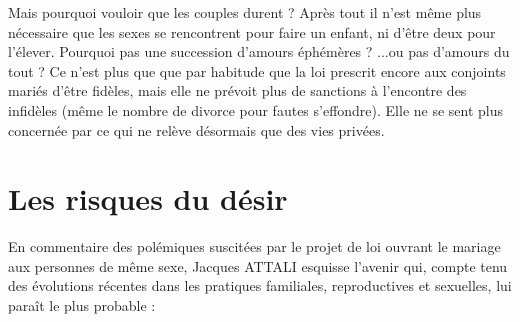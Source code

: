 Mais pourquoi vouloir que les couples durent ? Après tout il n'est même plus nécessaire que les sexes se rencontrent pour faire un enfant, ni d'être deux pour l'élever. Pourquoi pas une succession d'amours éphémères ?  ...ou pas d'amours du tout ? Ce n'est plus que que par habitude que la loi prescrit encore aux conjoints mariés d'être fidèles, mais elle ne prévoit plus de sanctions à l'encontre des infidèles (même le nombre de divorce pour fautes s'effondre). Elle ne se sent plus concernée par ce qui ne relève désormais que des vies privées. 

\section{Les risques du désir} 

En commentaire des polémiques suscitées par le projet de loi ouvrant le mariage aux personnes de même sexe, Jacques ATTALI esquisse l'avenir qui, compte tenu des évolutions récentes dans les pratiques familiales, reproductives et sexuelles, lui paraît le plus probable   : 

